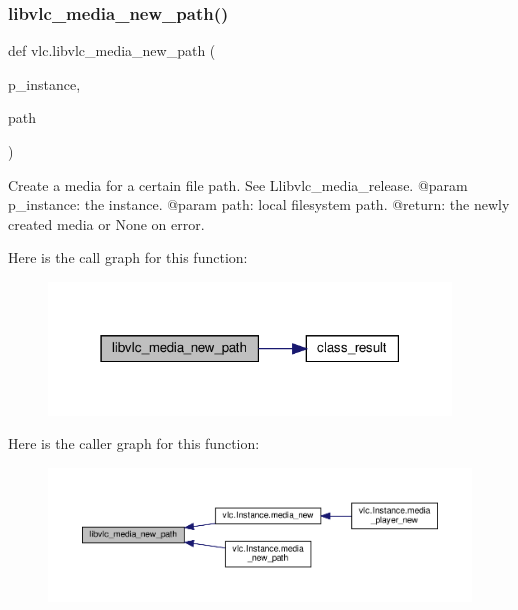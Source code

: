 \subsubsection{\texorpdfstring{libvlc\+\_\+media\+\_\+new\+\_\+path()}{libvlc\_media\_new\_path()}}
{\footnotesize\ttfamily def vlc.\+libvlc\+\_\+media\+\_\+new\+\_\+path (\begin{DoxyParamCaption}\item[{}]{p\+\_\+instance,  }\item[{}]{path }\end{DoxyParamCaption})}

\begin{DoxyVerb}Create a media for a certain file path.
See L{libvlc_media_release}.
@param p_instance: the instance.
@param path: local filesystem path.
@return: the newly created media or None on error.
\end{DoxyVerb}
 Here is the call graph for this function\+:
\nopagebreak
\begin{figure}[H]
\begin{center}
\leavevmode
\includegraphics[width=303pt]{namespacevlc_af8a94ee24b767ca229760d6630f20475_cgraph}
\end{center}
\end{figure}
Here is the caller graph for this function\+:
\nopagebreak
\begin{figure}[H]
\begin{center}
\leavevmode
\includegraphics[width=350pt]{namespacevlc_af8a94ee24b767ca229760d6630f20475_icgraph}
\end{center}
\end{figure}
\mbox{\label{namespacevlc_ab3d4fc6015921771f0ec5292b51ec157}} 
